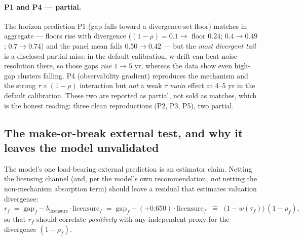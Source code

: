 \documentclass[11pt]{article}
\begin{document}
\paragraph{P1 and P4 --- partial.} The horizon prediction P1 (gap falls toward a divergence-set floor) matches in aggregate --- floors rise with divergence ($(1-\rho)=0.1\to$ floor $0.24$; $0.4\to0.49$; $0.7\to0.74$) and the panel mean falls $0.50\to0.42$ --- but the \emph{most divergent tail} is a disclosed partial miss: in the default calibration, w-drift can beat noise-resolution there, so those gaps \emph{rise} $1\to5$ yr, whereas the data show even high-gap clusters falling. P4 (observability gradient) reproduces the mechanism and the strong $\tau\times(1-\rho)$ interaction but \emph{not} a weak $\tau$ \emph{main} effect at 4--5 yr in the default calibration. These two are reported as partial, not sold as matches, which is the honest reading: three clean reproductions (P2, P3, P5), two partial.

\subsection{The make-or-break external test, and why it leaves the model unvalidated}

The model's one load-bearing external prediction is an estimator claim. Netting the licensing channel (and, per the model's own recommendation, \emph{not} netting the non-mechanism absorption term) should leave a residual that estimates valuation divergence:
\[
r_f \;=\; \mathrm{gap}_f - b_{\text{licensure}}\cdot\text{licensure}_f
\;=\; \mathrm{gap}_f - (+0.650)\cdot\text{licensure}_f
\;\;\widehat{=}\;\; \big(1-w(\tau_f)\big)\,(1-\rho_f),
\]
so that $r_f$ should correlate \emph{positively} with any independent proxy for the divergence $(1-\rho_f)$.
\end{document}
